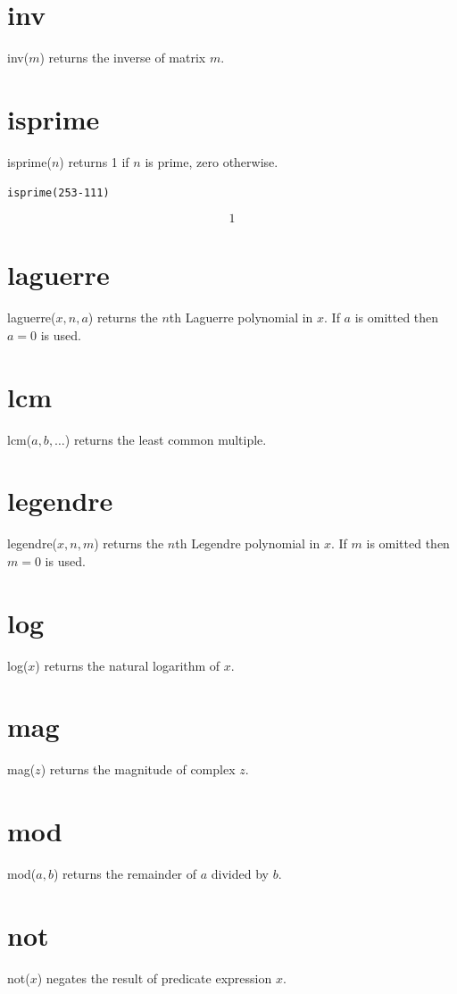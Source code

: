 \documentclass[12pt,openany]{report}
\begin{document}
\section*{inv}
inv($m$) returns the inverse of matrix $m$.

\section*{isprime}
isprime($n$) returns 1 if $n$ is prime, zero otherwise.

\medskip
{\tt isprime(2{}53-111)}

$$1$$

\section*{laguerre}
laguerre($x,n,a$) returns the $n$th Laguerre polynomial in $x$.
If $a$ is omitted then $a=0$ is used.

\section*{lcm}
lcm($a,b,\ldots$) returns the least common multiple.

\section*{legendre}
legendre($x,n,m$) returns the $n$th Legendre polynomial in $x$.
If $m$ is omitted then $m=0$ is used.

\section*{log}
log($x$) returns the natural logarithm of $x$.

\section*{mag}
mag($z$) returns the magnitude of complex $z$.

\section*{mod}
mod($a,b$) returns the remainder of $a$ divided by $b$.

\section*{not}
not($x$) negates the result of predicate expression $x$.
\end{document}

